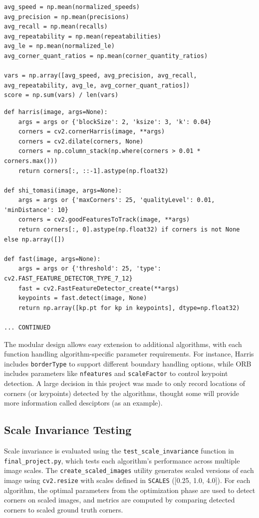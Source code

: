 \documentclass[journal]{IEEEtran}
\begin{document}
\newpage
\begin{lstlisting}[style=python, caption={Best Combination Scoring}, label={lst:scoring}]
avg_speed = np.mean(normalized_speeds)
avg_precision = np.mean(precisions)
avg_recall = np.mean(recalls)
avg_repeatability = np.mean(repeatabilities)
avg_le = np.mean(normalized_le)
avg_corner_quant_ratios = np.mean(corner_quantity_ratios)

vars = np.array([avg_speed, avg_precision, avg_recall, avg_repeatability, avg_le, avg_corner_quant_ratios])
score = np.sum(vars) / len(vars)
\end{lstlisting}

\begin{lstlisting}[style=python, caption={Corner Detection Wrapper Implementations}, label={lst:corern_methods}]
def harris(image, args=None):
    args = args or {'blockSize': 2, 'ksize': 3, 'k': 0.04}
    corners = cv2.cornerHarris(image, **args)
    corners = cv2.dilate(corners, None)
    corners = np.column_stack(np.where(corners > 0.01 * corners.max()))
    return corners[:, ::-1].astype(np.float32)

def shi_tomasi(image, args=None):
    args = args or {'maxCorners': 25, 'qualityLevel': 0.01, 'minDistance': 10}
    corners = cv2.goodFeaturesToTrack(image, **args)
    return corners[:, 0].astype(np.float32) if corners is not None else np.array([])

def fast(image, args=None):
    args = args or {'threshold': 25, 'type': cv2.FAST_FEATURE_DETECTOR_TYPE_7_12}
    fast = cv2.FastFeatureDetector_create(**args)
    keypoints = fast.detect(image, None)
    return np.array([kp.pt for kp in keypoints], dtype=np.float32)

... CONTINUED
\end{lstlisting}
\twocolumn

The modular design allows easy extension to additional algorithms, with each function handling algorithm-specific parameter requirements. For instance, Harris includes \texttt{borderType} to support different boundary handling options, while ORB includes parameters like \texttt{nfeatures} and \texttt{scaleFactor} to control keypoint detection. A large decision in this project was made to only record locations of corners (or keypoints) detected by the algorithms, thought some will provide more information called desciptors (as an example). \\

\subsection{Scale Invariance Testing}
Scale invariance is evaluated using the \texttt{test\_scale\_invariance} function in \texttt{final\_project.py}, which tests each algorithm’s performance across multiple image scales. The \texttt{create\_scaled\_images} utility generates scaled versions of each image using \texttt{cv2.resize} with scales defined in \texttt{SCALES} ([0.25, 1.0, 4.0]). For each algorithm, the optimal parameters from the optimization phase are used to detect corners on scaled images, and metrics are computed by comparing detected corners to scaled ground truth corners.\\
\end{document}
